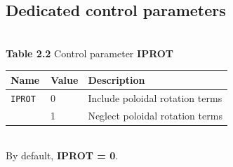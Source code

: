 \subsection{Dedicated control parameters}
\\
{\bf Table 2.2} Control parameter {\bf IPROT}\\[2ex]
\begin{tabular}{|l|l|l|}					\hline
\bf Name	&\bf Value & Description\\ \hline
\tt IPROT 	& 0 & Include poloidal rotation terms \\
\tt  	& 1 &  Neglect poloidal rotation terms \\ 
\hline
\end{tabular}
\bigskip\\
By default, {\bf IPROT = 0}.


\clearpage
